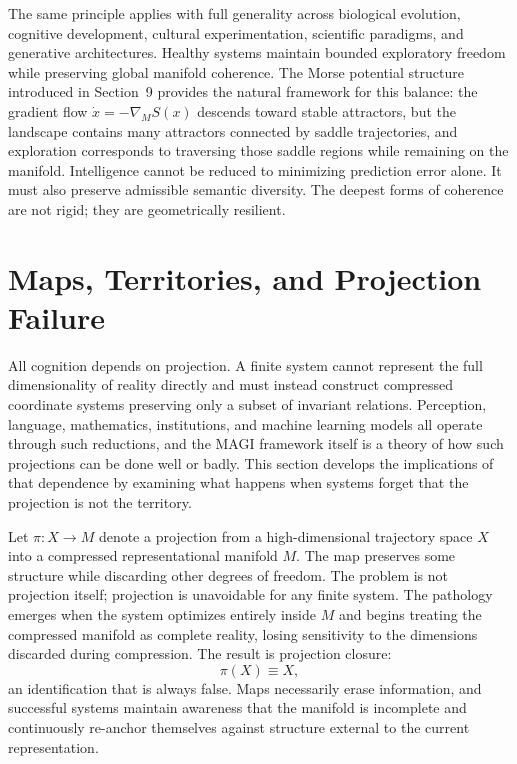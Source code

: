 \documentclass[11pt,a4paper,twocolumn]{article}
\begin{document}
The same principle applies with full generality across
biological evolution, cognitive development, cultural
experimentation, scientific paradigms, and generative
architectures. Healthy systems maintain bounded exploratory
freedom while preserving global manifold coherence. The
Morse potential structure introduced in Section~9 provides
the natural framework for this balance: the gradient flow
$\dot{x} = -\nabla_M S(x)$ descends toward stable attractors,
but the landscape contains many attractors connected by
saddle trajectories, and exploration corresponds to
traversing those saddle regions while remaining on the
manifold. Intelligence cannot be reduced to minimizing
prediction error alone. It must also preserve admissible
semantic diversity. The deepest forms of coherence are not
rigid; they are geometrically resilient.


\section{Maps, Territories, and Projection Failure}

All cognition depends on projection. A finite system cannot
represent the full dimensionality of reality directly and
must instead construct compressed coordinate systems
preserving only a subset of invariant relations. Perception,
language, mathematics, institutions, and machine learning
models all operate through such reductions, and the MAGI
framework itself is a theory of how such projections can be
done well or badly. This section develops the implications
of that dependence by examining what happens when systems
forget that the projection is not the territory.

Let $\pi : X \to M$ denote a projection from a high-dimensional
trajectory space $X$ into a compressed representational manifold
$M$. The map preserves some structure while discarding other
degrees of freedom. The problem is not projection itself;
projection is unavoidable for any finite system. The pathology
emerges when the system optimizes entirely inside $M$ and
begins treating the compressed manifold as complete reality,
losing sensitivity to the dimensions discarded during
compression. The result is projection closure:
\[
\pi(X) \equiv X,
\]
an identification that is always false. Maps necessarily
erase information, and successful systems maintain awareness
that the manifold is incomplete and continuously re-anchor
themselves against structure external to the current
representation.
\end{document}
